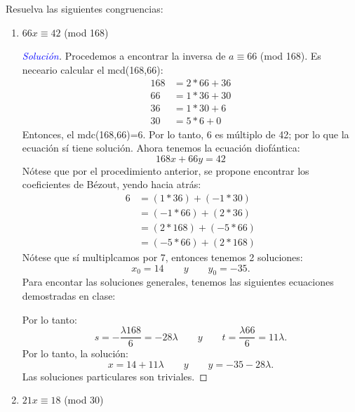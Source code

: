\documentclass[a4paper,12pt]{article}
\newenvironment{solution}
  {\renewcommand\qedsymbol{$\square$}\begin{proof}[\textcolor{blue}{Solución}]}
  {\end{proof}}
\begin{document}
Resuelva las siguientes congruencias:
\begin{enumerate}
	\item $66x \equiv 42$ (mod 168)
	\begin{solution}
		Procedemos a encontrar la inversa de $a\equiv 66 $ (mod 168). Es neceario calcular el mcd(168,66):
		\begin{align*}
			168 &= 2*66 + 36\\
			66 &= 1*36 + 30\\
			36 &= 1*30 + 6\\
			30 &= 5*6 + 0
		\end{align*}
	Entonces, el mdc(168,66)=6.  Por lo tanto, 6 es múltiplo de 42; por lo que la ecuación sí tiene solución. Ahora tenemos la ecuación diofántica:
	$$168x+66y=42$$ 
	Nótese que por el procedimiento anterior, se propone encontrar los coeficientes de Bézout, yendo hacia atrás:
	\begin{align*}
6	&=	(1 * 36) + (-1 * 30)\\
&=	(-1 * 66) + (2 * 36)\\
&=	(2 * 168) + (-5 * 66)\\
&=	(-5 * 66) + (2 * 168)
	\end{align*}
Nótese que sí multiplcamos por 7, entonces tenemos 2 soluciones: 
$$x_0=14 \qquad y \qquad y_0=-35.$$
Para encontar las soluciones generales, tenemos las siguientes ecuaciones demostradas en clase: 
\begin{center}
\end{center}
Por lo tanto: 
$$s=-\frac{\lambda 168}{6}=-28\lambda \qquad y \qquad t=\frac{\lambda 66}{6}=11\lambda.$$
Por lo tanto, la solución: 
$$x=14+11\lambda \qquad y \qquad  y= -35-28\lambda.$$	
	Las soluciones particulares son triviales.
	\end{solution}
	\item $21x \equiv 18$ (mod 30)
	

\end{enumerate}
\end{document}
